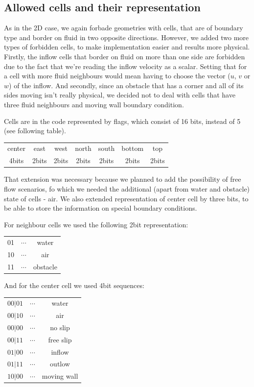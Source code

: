 \documentclass[a4paper, 12pt]{article}
\begin{document}
\subsection{Allowed cells and their representation}\label{sec:forb}
As in the 2D case, we again forbade geometries with cells, that are of boundary type and border on fluid in two opposite directions. However, 
we added two more types of forbidden cells, to make implementation easier and results more physical.
Firstly, the inflow cells that border on fluid on more than one side are forbidden due to the fact that we're reading the inflow velocity as a scalar.
Setting that for a cell with more fluid neighbours would mean having to choose the vector ($u$, $v$ or $w$) of the inflow.    
And secondly, since an obstacle that has a corner and all of its sides moving isn't really physical, we decided not to deal with cells that have three
fluid neighbours and moving wall boundary condition.

Cells are in the code represented by flags, which consist of 16 bits, instead of 5 (see following table). %
\begin{table}[hb!]
\label{tab4}
\centering
\begin{tabular}{|c||c|c|c|c|c|c|}
\hline
center & east & west & north & south & bottom & top \\ 
4bits & 2bits & 2bits & 2bits & 2bits & 2bits & 2bits\\
\hline
\end{tabular}
\end{table} 
That extension was necessary because we planned to add the possibility of free flow scenarios,
fo which we needed the additional (apart from water and obstacle) state of cells - air. We also extended representation of center cell by three bits, to
be able to store the information on special boundary conditions.

For neighbour cells we used the following 2bit representation: 
\begin{center}
\begin{tabular}{ccc}
01 & $\cdots$ & water \\
10 & $\cdots$ & air \\
11 & $\cdots$ & obstacle
\end{tabular}
\end{center}
And for the center cell we used 4bit sequences:
\begin{center}
\begin{tabular}{ccc}
$00|01$ & $\cdots$ & water \\
$00|10$ & $\cdots$ & air \\
$00|00$ & $\cdots$ & no slip \\
$00|11$ & $\cdots$ & free slip \\
$01|00$ & $\cdots$ & inflow \\
$01|11$ & $\cdots$ & outlow \\
$10|00$ & $\cdots$ & moving wall 
\end{tabular}
\end{center}
\end{document}

